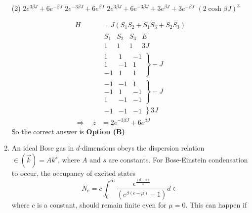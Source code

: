 \begin{enumerate}
\begin{tasks}(2)
	\task[\textbf{A.}]  $2 e^{3 \beta J}+6 e^{-\beta J}$
	\task[\textbf{B.}] $2 e^{-3 \beta J}+6 e^{\beta J}$
	\task[\textbf{C.}] $2 e^{3 \beta J}+6 e^{-3 \beta J}+3 e^{\beta J}+3 e^{-\beta J}$
	\task[\textbf{D.}] $(2 \cosh \beta J)^{3}$
\end{tasks}
\begin{answer}
	\begin{align*}
	H&=J\left(S_{1} S_{2}+S_{1} S_{3}+S_{2} S_{3}\right)\\
	&\begin{array}{cccc}S_{1} & S_{2} & S_{3} & E \\ 1 & 1 & 1 & 3 J\end{array}\\
	&\left.\begin{array}{ccc}1 & 1 & -1 \\ 1 & -1 & 1 \\ -1 & 1 & 1\end{array}\right\}-J\\
	&\left.\begin{array}{ccc}-1 & -1 & 1 \\ -1 & 1 & -1 \\ 1 & -1 & -1\end{array}\right\}-J\\
	&\left.\begin{array}{lll}-1 & -1 & -1\end{array}\right\} 3 J\\
	\Rightarrow \quad z&=2 e^{-3 \beta J}+6 e^{\beta J}
	\end{align*}
	So the correct answer is \textbf{Option (B)}
\end{answer}

	\item An ideal Bose gas in $d$-dimensions obeys the dispersion relation $\in(\vec{k})=A k^{s}$, where $A$ and $s$ are constants. For Bose-Einstein condensation to occur, the occupancy of excited states
	$$
	N_{e}=c \int_{0}^{\infty} \frac{\epsilon^{\frac{(d-s)}{s}}}{\left(e^{\beta(\epsilon-\mu)}-1\right)} d \in
	$$
	where $c$ is a constant, should remain finite even for $\mu=0$. This can happen if
	{}


\end{enumerate}
